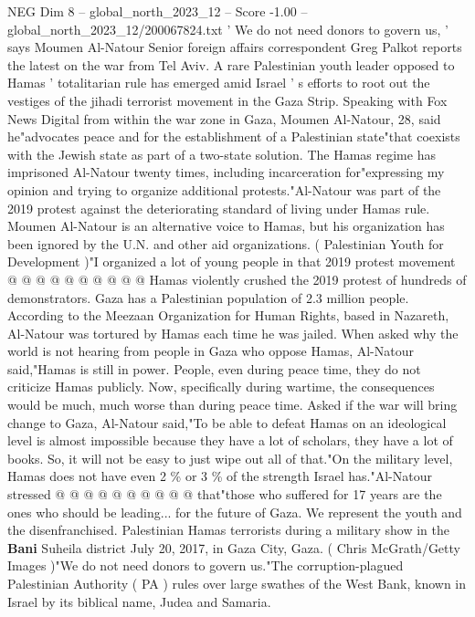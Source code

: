 \begin{textsample}{NEG Dim 8 – global\_north\_2023\_12 – Score -1.00 – global\_north\_2023\_12/200067824.txt}  \label{ex:f8_neg_346}
' We do not need donors to govern us, ' says Moumen Al-Natour Senior foreign affairs correspondent Greg Palkot reports the latest on the war from Tel Aviv.
A rare Palestinian youth leader opposed to Hamas ' totalitarian rule has emerged amid Israel ' s efforts to root out the vestiges of the jihadi terrorist movement in the Gaza Strip.
Speaking with Fox News Digital from within the war zone in Gaza, Moumen Al-Natour, 28, said he"advocates peace and for the establishment of a Palestinian state"that coexists with the Jewish state as part of a two-state solution.
The Hamas regime has imprisoned Al-Natour twenty times, including incarceration for"expressing my opinion and trying to organize additional protests."Al-Natour was part of the 2019 protest against the deteriorating standard of living under Hamas rule.
Moumen Al-Natour is an alternative voice to Hamas, but his organization has been ignored by the U.N. and other aid organizations. ( Palestinian Youth for Development )"I organized a lot of young people in that 2019 protest movement @ @ @ @ @ @ @ @ @ @ Hamas violently crushed the 2019 protest of hundreds of demonstrators.
Gaza has a Palestinian population of 2.3 million people.
According to the Meezaan Organization for Human Rights, based in Nazareth, Al-Natour was tortured by Hamas each time he was jailed.
When asked why the world is not hearing from people in Gaza who oppose Hamas, Al-Natour said,"Hamas is still in power.
People, even during peace time, they do not criticize Hamas publicly.
Now, specifically during wartime, the consequences would be much, much worse than during peace time.
Asked if the war will bring change to Gaza, Al-Natour said,"To be able to defeat Hamas on an ideological level is almost impossible because they have a lot of scholars, they have a lot of books.
So, it will not be easy to just wipe out all of that."On the military level, Hamas does not have even 2 \% or 3 \% of the strength Israel has."Al-Natour stressed @ @ @ @ @ @ @ @ @ @ that"those who suffered for 17 years are the ones who should be leading... for the future of Gaza.
We represent the youth and the disenfranchised.
Palestinian Hamas terrorists during a military show in the \textbf{Bani} Suheila district July 20, 2017, in Gaza City, Gaza. ( Chris McGrath/Getty Images )"We do not need donors to govern us."The corruption-plagued Palestinian Authority ( PA ) rules over large swathes of the West Bank, known in Israel by its biblical name, Judea and Samaria.

\end{textsample}
